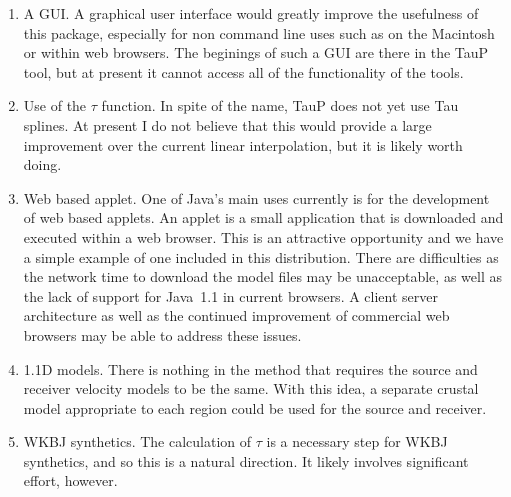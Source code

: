 \begin{enumerate}
\item A GUI. A graphical user interface would greatly improve the usefulness
of this package, especially for non command line uses such as on the Macintosh
or within web browsers. The beginings of such a GUI are there in the TauP tool,
but at present it cannot access all of the functionality of the tools.

\item Use of the $\tau$ function. In spite of the name, TauP does not yet use
Tau splines. At present I do not believe that this would provide a large
improvement over the current linear interpolation, but it is likely worth doing.

\item Web based applet. One of Java's main uses currently is for the development of web based applets. An applet is a small application that is downloaded and
executed within a web browser. This is an attractive opportunity and we have a simple
example of one included in this distribution. 
There are difficulties as the network time to download the 
model files may be unacceptable, as well as the lack of support for Java~1.1 in current browsers. A client server architecture as well as the continued improvement of commercial web browsers
may be able to address these issues.

\item 1.1D models. There is nothing in the method that requires the source and
receiver velocity models to be the same. With this idea, a separate crustal 
model appropriate to each region could be used for the source and receiver.

\item WKBJ synthetics. The calculation of $\tau$ is a necessary step for WKBJ 
synthetics, and so this is a natural direction. It likely involves significant 
effort, however.
\end{enumerate}

